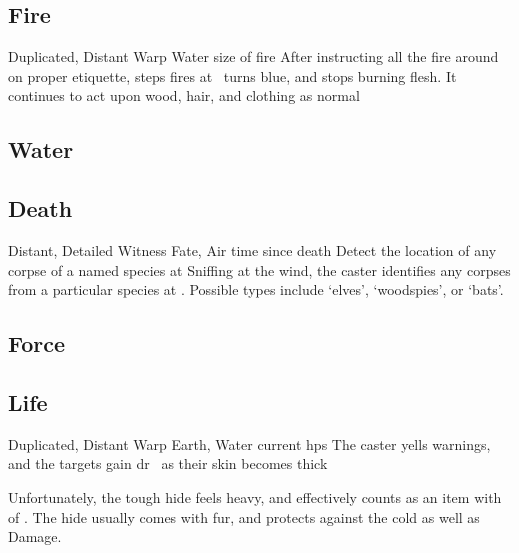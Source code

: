 \begin{multicols}{2}
\subsection{Fire}


  {Duplicated, Distant}%
  {Warp}%
  {Water}%
  {size of fire}%
  {After instructing all the fire around on proper etiquette,  \glspl{step} fires at \spellRange\ turns blue, and stops burning flesh.
  It continues to act upon wood, hair, and clothing as normal}%
  {}

\subsection{Water}


\subsection{Death}


  {Distant, Detailed}%
  {Witness}%
  {Fate, Air}%
  {time since death}%
  {Detect the location of any corpse of a named species at \spellRange}%
  {
    Sniffing at the wind, the caster identifies any corpses from a particular species at \spellRange.
    Possible types include `elves', `woodspies', or `bats'.}

\subsection{Force}


\subsection{Life}


  {Duplicated, Distant}%
  {Warp}%
  {Earth, Water}%
  {current \glspl{hp}}%
  {The caster yells warnings, and the targets gain \gls{dr}~ as their skin becomes thick}%
  {Unfortunately, the tough hide feels heavy, and effectively counts as an item with  of .
  The hide usually comes with fur, and protects against the cold as well as Damage.

}
\end{multicols}
